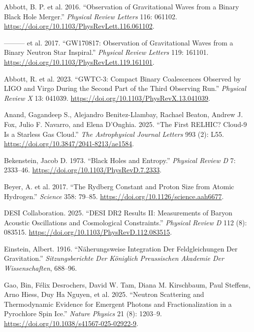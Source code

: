 \documentclass[
  11pt,
  letterpaper,
  twoside,
  openright]{book}
\newlength{\cslhangindent}
\newenvironment{CSLReferences}[2] %
 {\begin{list}{}{%
  \setlength{\itemindent}{0pt}
  \setlength{\leftmargin}{0pt}
  \setlength{\parsep}{0pt}
  \ifodd #1
   \setlength{\leftmargin}{\cslhangindent}
   \setlength{\itemindent}{-1\cslhangindent}
  \fi
  \setlength{\itemsep}{#2\baselineskip}}}
 {\end{list}}
\begin{document}
\label{refs}
\begin{CSLReferences}{1}{0}
Abbott, B. P. et al. 2016. {``Observation of Gravitational Waves from a
Binary Black Hole Merger.''} \emph{Physical Review Letters} 116: 061102.
\url{https://doi.org/10.1103/PhysRevLett.116.061102}.

--------- et al. 2017. {``GW170817: Observation of Gravitational Waves
from a Binary Neutron Star Inspiral.''} \emph{Physical Review Letters}
119: 161101. \url{https://doi.org/10.1103/PhysRevLett.119.161101}.

Abbott, R. et al. 2023. {``GWTC-3: Compact Binary Coalescences Observed
by LIGO and Virgo During the Second Part of the Third Observing Run.''}
\emph{Physical Review X} 13: 041039.
\url{https://doi.org/10.1103/PhysRevX.13.041039}.

Anand, Gagandeep S., Alejandro Benitez-Llambay, Rachael Beaton, Andrew
J. Fox, Julio F. Navarro, and Elena D'Onghia. 2025. {``The First
{RELHIC}? {Cloud-9} Is a Starless Gas Cloud.''} \emph{The Astrophysical
Journal Letters} 993 (2): L55.
\url{https://doi.org/10.3847/2041-8213/ae1584}.

Bekenstein, Jacob D. 1973. {``Black Holes and Entropy.''} \emph{Physical
Review D} 7: 2333--46. \url{https://doi.org/10.1103/PhysRevD.7.2333}.

Beyer, A. et al. 2017. {``The {R}ydberg Constant and Proton Size from
Atomic Hydrogen.''} \emph{Science} 358: 79--85.
\url{https://doi.org/10.1126/science.aah6677}.

DESI Collaboration. 2025. {``{DESI} {DR2} Results {II}: Measurements of
Baryon Acoustic Oscillations and Cosmological Constraints.''}
\emph{Physical Review D} 112 (8): 083515.
\url{https://doi.org/10.1103/PhysRevD.112.083515}.

Einstein, Albert. 1916. {``N{ä}herungsweise Integration Der
Feldgleichungen Der Gravitation.''} \emph{Sitzungsberichte Der
K{ö}niglich Preussischen Akademie Der Wissenschaften}, 688--96.

Gao, Bin, Félix Desrochers, David W. Tam, Diana M. Kirschbaum, Paul
Steffens, Arno Hiess, Duy Ha Nguyen, et al. 2025. {``Neutron Scattering
and Thermodynamic Evidence for Emergent Photons and Fractionalization in
a Pyrochlore Spin Ice.''} \emph{Nature Physics} 21 (8): 1203--9.
\url{https://doi.org/10.1038/s41567-025-02922-9}.


\end{CSLReferences}
\end{document}

